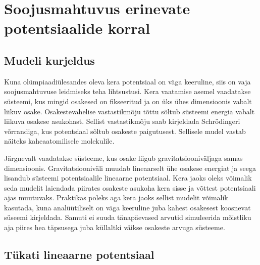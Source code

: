 \documentclass{trkut}%
\begin{document}

\chapter{Soojusmahtuvus erinevate potentsiaalide korral}

\section{Mudeli kurjeldus}

Kuna olümpiaadiülesandes oleva kera potentsiaal on väga keeruline, siis on vaja soojusmahtuvuse leidmiseks teha lihtsustusi.
Kera vaatamise asemel vaadatakse süsteemi, kus mingid osakesed on fikseeritud ja on üks ühes dimensioonis vabalt liikuv osake.
Osakestevahelise vastastikmõju tõttu sõltub süsteemi energia vabalt liikuva osakese asukohast.
Sellist vastastikmõju saab kirjeldada Schrödingeri võrrandiga, kus potentsiaal sõltub osakeste paigutusest.
Sellisele mudel vastab näiteks kaheaatomilisele molekulile.

Järgnevalt vaadatakse süsteeme, kus osake liigub gravitatsiooniväljaga samas dimensioonis.
Gravitatsiooniväli muudab lineaarselt ühe osakese energiat ja seega lisandub süsteemi potentsiaalile lineaarne potentsiaal.
Kera jaoks oleks võimalik seda mudelit laiendada piirates osakeste asukoha kera sisse ja võttest potentsiaali ajas muutuvaks.
Praktikas poleks aga kera jaoks sellist mudelit võimalik kasutada, kuna analüütiliselt on väga keeruline juba kahest osakesest koosnevat süseemi kirjeldada.
Samuti ei suuda tänapäevased arvutid simuleerida mõistliku aja piires hea täpsusega juba küllaltki väikse osakeste arvuga süsteeme.

\section{Tükati lineaarne potentsiaal}
\end{document}
